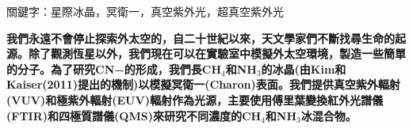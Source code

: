 \begin{abstractcn}

關鍵字：星際冰晶，冥衛一，真空紫外光，超真空紫外光
\vspace{2em}

\textbf{我們永遠不會停止探索外太空的，自二十世紀以來，天文學家們不斷找尋生命的起源。除了觀測恆星以外，我們現在可以在實驗室中模擬外太空環境，製造一些簡單的分子。為了研究CN−的形成，我們長CH$_4$和NH$_3$的冰晶(由Kim和Kaiser(2011)\cite{kim}提出的機制)以模擬冥衛一(Charon)表面。我們提供真空紫外輻射(VUV)和極紫外輻射(EUV)輻射作為光源，主要使用傅里葉變換紅外光譜儀(FTIR)和四極質譜儀(QMS)來研究不同濃度的CH$_4$和NH$_3$冰混合物。}


\end{abstractcn} 

